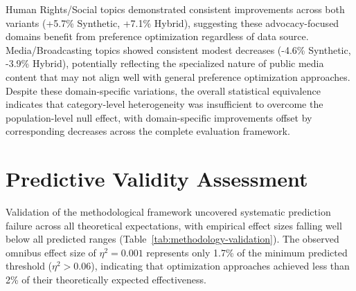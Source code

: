 Human Rights/Social topics demonstrated consistent improvements across both variants (+5.7\% Synthetic, +7.1\% Hybrid), suggesting these advocacy-focused domains benefit from preference optimization regardless of data source. Media/Broadcasting topics showed consistent modest decreases (-4.6\% Synthetic, -3.9\% Hybrid), potentially reflecting the specialized nature of public media content that may not align well with general preference optimization approaches. Despite these domain-specific variations, the overall statistical equivalence indicates that category-level heterogeneity was insufficient to overcome the population-level null effect, with domain-specific improvements offset by corresponding decreases across the complete evaluation framework.


\section{Predictive Validity Assessment}
\label{sec:validation-results}

Validation of the methodological framework uncovered systematic prediction failure across all theoretical expectations, with empirical effect sizes falling well below all predicted ranges (Table~\ref{tab:methodology-validation}). The observed omnibus effect size of $\eta^2 = 0.001$ represents only 1.7\% of the minimum predicted threshold ($\eta^2 > 0.06$), indicating that optimization approaches achieved less than 2\% of their theoretically expected effectiveness.

